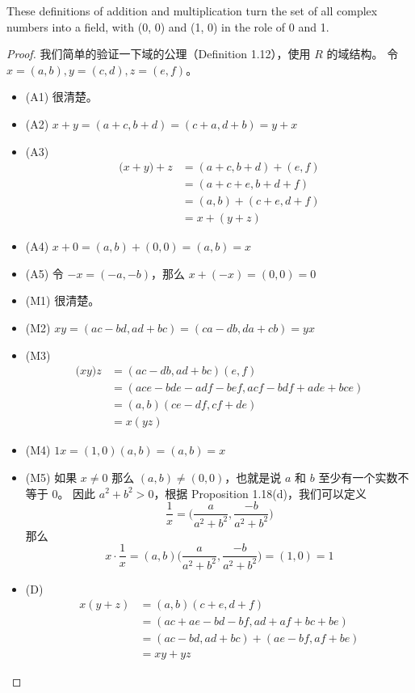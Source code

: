 \documentclass[../poma-notes.tex]{subfiles}
\begin{document}
\setcounter{poma}{24}
\begin{theorem}
  These definitions of addition and multiplication turn the set of all complex numbers into a field,
  with (0, 0) and (1, 0) in the role of 0 and 1.
\end{theorem}

\begin{proof}
  我们简单的验证一下域的公理（Definition 1.12），使用 $R$ 的域结构。
  令 $x=(a,b), y=(c,d), z=(e,f)$。
  \begin{itemize}
    \item[] (A1) 很清楚。
    \item[] (A2) $x+y = (a+c,b+d) = (c+a,d+b) = y+x$
    \item[] (A3)
      \vspace{-26pt}
      \begin{align*}
        \mathcal (x+y)+z & = (a+c,b+d) + (e,f) \\
                         & = (a+c+e, b+d+f)    \\
                         & = (a,b) + (c+e,d+f) \\
                         & = x+(y+z)
      \end{align*}
    \item[] (A4) $x+0 = (a,b) + (0,0) = (a,b) = x$
    \item[] (A5) 令 $-x = (-a,-b)$，那么 $x+(-x) = (0,0) = 0$
    \item[] (M1) 很清楚。
    \item[] (M2) $xy = (ac-bd,ad+bc) = (ca-db,da+cb) = yx$
    \item[] (M3)
      \vspace{-26pt}
      \begin{align*}
        \mathcal (xy)z & = (ac-db,ad+bc)(e,f)                \\
                       & = (ace-bde-adf-bef,acf-bdf+ade+bce) \\
                       & = (a,b)(ce-df,cf+de)                \\
                       & = x(yz)
      \end{align*}
    \item[] (M4) $1x  =(1,0)(a,b) = (a,b) = x$
    \item[] (M5) 如果 $x \ne 0$ 那么 $(a,b) \ne (0,0)$，也就是说 $a$ 和 $b$ 至少有一个实数不等于 0。
      因此 $a^2+b^2>0$，根据 Proposition 1.18(d)，我们可以定义
      \[\frac{1}{x} = \bigl(\frac{a}{a^2+b^2}, \frac{-b}{a^2+b^2}\bigr)\]
      那么
      \[x \cdot \frac{1}{x} = (a,b)\bigl(\frac{a}{a^2+b^2}, \frac{-b}{a^2+b^2}\bigr) = (1,0) = 1\]
    \item[] (D)
      \vspace{-26pt}
      \begin{align*}
        \mathcal{} x(y+z) & = (a,b)(c+e,d+f)                \\
                          & = (ac+ae-bd-bf,ad+af+bc+be)     \\
                          & = (ac-bd,ad+bc) + (ae-bf,af+be) \\
                          & = xy + yz
      \end{align*}
  \end{itemize}
\end{proof}
\end{document}
